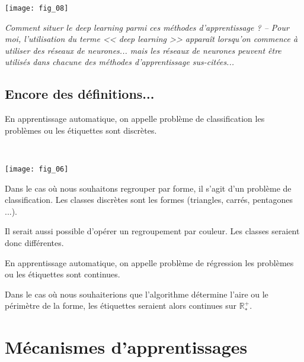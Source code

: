 \begin{center}
\texttt{[image: fig\_08]}
\end{center}

\textit{Comment situer le deep learning parmi ces méthodes d'apprentissage ? --  Pour moi,  l'utilisation du terme << deep learning >> apparaît lorsqu'on commence à utiliser des réseaux de neurones... mais les réseaux de neurones peuvent être utilisés dans chacune des méthodes d'apprentissage sus-citées...}

\subsection{Encore des définitions...}

\begin{defi}[Classification]
En apprentissage automatique, on appelle problème de classification les problèmes ou les étiquettes sont discrètes.
\end{defi}

\begin{exemple} ~\\

\begin{center}
\texttt{[image: fig\_06]}
\end{center}

Dans le cas où nous souhaitons regrouper par forme, il s'agit d'un problème de classification. Les classes discrètes sont les formes (triangles, carrés, pentagones ...). 

Il serait aussi possible d'opérer un regroupement par couleur. Les classes seraient donc différentes.
\end{exemple}

\begin{defi}[Régression]
En apprentissage automatique, on appelle problème de régression les problèmes ou les étiquettes sont continues.
\end{defi}

\begin{exemple}
Dans le cas où nous souhaiterions que l'algorithme détermine l'aire ou le périmètre de la forme, les étiquettes seraient alors continues sur $\mathbb{R}^{+}_{*}$.

\end{exemple}


\section{Mécanismes d'apprentissages}

